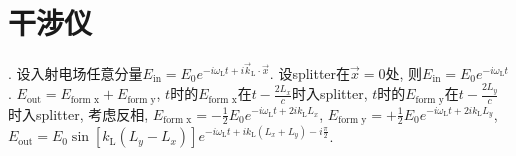 \chapter{干涉仪}

\cite{Maggiore2014}. 设入射电场任意分量$E_\text{in}=E_0e^{-i\omega_\text{L}t+i\vec{k}_\text{L}\cdot\vec{x}}$. 设splitter在$\vec{x}=0$处, 则$E_\text{in}=E_0e^{-i\omega_\text{L}t}$. $E_\text{out}=E_\text{form x}+E_\text{form y}$, $t$时的$E_\text{form x}$在$t-\frac{2L_x}{c}$时入splitter, $t$时的$E_\text{form y}$在$t-\frac{2L_y}{c}$时入splitter, 考虑反相, $E_\text{form x}=-\frac{1}{2}E_0e^{-i\omega_\text{L}t+2ik_\text{L}L_x}$, $E_\text{form y}=+\frac{1}{2}E_0e^{-i\omega_\text{L}t+2ik_\text{L}L_y}$, $E_\text{out}=E_0\sin[k_\text{L}(L_y-L_x)]e^{-i\omega_\text{L}t+ik_\text{L}(L_x+L_y)-i\frac{\pi}{2}}$.

